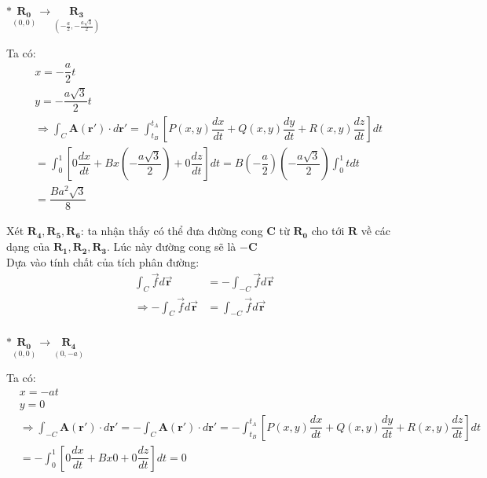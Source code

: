 \documentclass{report}
\begin{document}
\noindent $\ast \underset{(0,0)}{\mathbf{R_0}}  \longrightarrow \underset{(-\frac{a}{2},-\frac{a\sqrt{3}}{2})}{\mathbf{R_3}}$

Ta có:
\begin{align*}
	 & x = -\dfrac{a}{2}t                                                                                                                                                                           \\
	 & y = -\dfrac{a\sqrt{3}}{2}t                                                                                                                                                                   \\
	 & \Rightarrow \int_{C} \mathbf{A}(\mathbf{r'})\cdot d\mathbf{r'} =  \int_{t_B}^{t_A} \left[ P(x,y)\dfrac{dx}{dt} + Q(x,y)\dfrac{dy}{dt} + R(x,y)\dfrac{dz}{dt} \right] dt                      \\
	 & = \int_{0}^{1} \left[ 0\dfrac{dx}{dt} + Bx\left(-\dfrac{a\sqrt{3}}{2}\right) + 0\dfrac{dz}{dt} \right] dt = B \left( -\dfrac{a}{2}\right)\left(-\dfrac{a\sqrt{3}}{2}\right) \int_{0}^{1}t dt \\
	 & = \dfrac{Ba^2\sqrt{3}}{8}
\end{align*}

\clearpage

Xét $\mathbf{R_4},\mathbf{R_5},\mathbf{R_6}$: ta nhận thấy có thể đưa đường
cong $\mathbf{C}$ từ $\mathbf{R_0}$ cho tới $\mathbf{R}$ về các dạng của
$\mathbf{R_1},\mathbf{R_2},\mathbf{R_3}$. Lúc này đường cong sẽ là
$\mathbf{-C}$ \\ Dựa vào tính chất của tích phân đường:
\begin{align*}
	\int_{C}^{}\vec{f}d\vec{\mathbf{r}}              & = - \int_{-C}^{}\vec{f}d\vec{\mathbf{r}} \\
	\Rightarrow -\int_{C}^{}\vec{f}d\vec{\mathbf{r}} & = \int_{-C}^{}\vec{f}d\vec{\mathbf{r}}   \\
\end{align*}

\noindent $\ast \underset{(0,0)}{\mathbf{R_0}}  \longrightarrow \underset{(0,-a)}{\mathbf{R_4}}$

Ta có:
\begin{align*}
	 & x = - at                                                                                                                                                                                                                       \\
	 & y = 0                                                                                                                                                                                                                          \\
	 & \Rightarrow \int_{-C} \mathbf{A}(\mathbf{r'})\cdot d\mathbf{r'} =-\int_{C} \mathbf{A}(\mathbf{r'})\cdot d\mathbf{r'}=  - \int_{t_B}^{t_A} \left[ P(x,y)\dfrac{dx}{dt} + Q(x,y)\dfrac{dy}{dt} + R(x,y)\dfrac{dz}{dt} \right] dt \\
	 & = - \int_{0}^{1} \left[ 0\dfrac{dx}{dt} + Bx0 + 0\dfrac{dz}{dt} \right] dt = 0
\end{align*}
\end{document}
